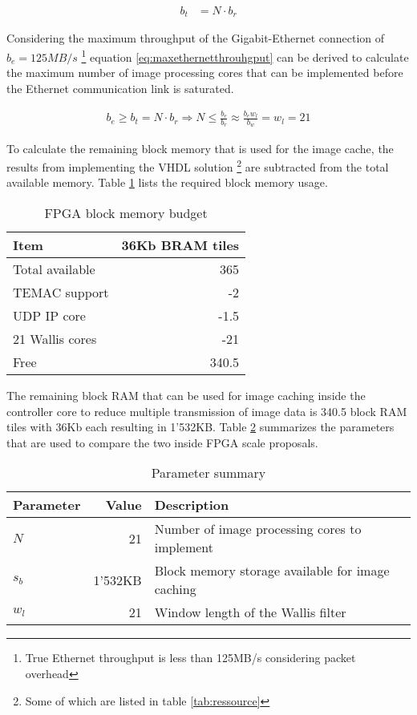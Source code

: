 \begin{align}
    b_t  & = N \cdot b_r
    \label{eq:scaledrealttotalhroughput}
\end{align}

Considering the maximum throughput of the Gigabit-Ethernet connection of
$b_e=125MB/s$ \footnote{True Ethernet throughput is less than 125MB/s
considering packet overhead} equation \ref{eq:maxethernetthrouhgput} can be derived to calculate the
maximum number of image processing cores that can be implemented before the
Ethernet communication link is saturated.

\begin{align}
    b_e \geq b_t = N \cdot b_r \Rightarrow N \leq \frac{b_e}{b_r} \approx 
    \frac{b_e w_l}{b_w} = w_l = 21
    \label{eq:maxethernetthrouhgput}
\end{align}

To calculate the remaining block memory that is used for the image cache, the
results from implementing the VHDL solution
\footnote{Some of which are listed in table \ref{tab:ressource}} 
are subtracted from the total available memory. Table \ref{tab:membudget}
lists the required block memory usage.

\begin{table}[h!]
    \centering
    \begin{tabular}{l r}
        \toprule
        Item & 36Kb BRAM tiles \footnotemark \\
        \midrule
        Total available & 365 \\
        TEMAC support & -2 \\
        UDP IP core & -1.5 \\
        21 Wallis cores & -21 \\
        \midrule
        Free & 340.5\\
        \bottomrule
    \end{tabular}
    \caption{FPGA block memory budget}
    \label{tab:membudget}
\end{table}

The remaining block RAM that can be used for image caching inside the controller
core to reduce multiple transmission of image data is 340.5
block RAM tiles with 36Kb each resulting in 1'532KB. Table \ref{tab:parsum}
summarizes the parameters that are used to compare the two inside FPGA scale
proposals.

\begin{table}[h!]
    \centering
    \begin{tabular}{l r l}
        \toprule
        Parameter & Value & Description\\
        \midrule
        $N$ & 21 & Number of image processing cores to implement \\
        $s_b$ & 1'532KB & Block memory storage available for image caching \\
        $w_l$ & 21 & Window length of the Wallis filter \\
        \bottomrule
    \end{tabular}
    \caption{Parameter summary}
    \label{tab:parsum}
\end{table}

